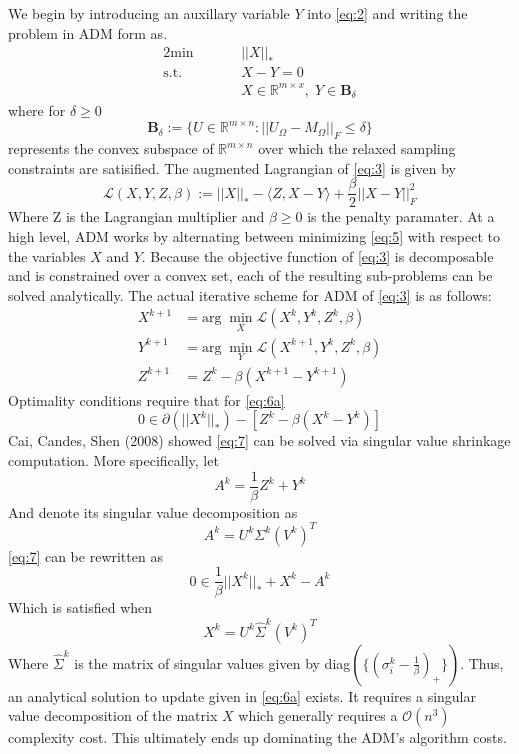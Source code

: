 \documentclass{article}
\begin{document}
We begin by introducing an auxillary variable $Y$ into \ref{eq:2} and writing the problem in ADM form as.  
\begin{alignat}{2} \label{eq:3}
\textrm{min}& \quad &&||X||_* \\
\textrm{s.t.}& &&X -Y = 0 \nonumber\\
& &&X \in \mathbb{R}^{m \times x}, \; Y \in \textbf{B}_\delta \nonumber
\end{alignat}
where for $\delta \ge 0$
\begin{equation}
\textbf{B}_\delta := \{ U \in \mathbb{R}^{m \times n}: ||U_\Omega - M_\Omega||_F \le \delta\}
\end{equation} 
represents the convex subspace of $\mathbb{R}^{m \times n}$ over which the relaxed sampling constraints are satisified. 
The augmented Lagrangian of \ref{eq:3} is given by
\begin{equation} \label{eq:5}
\mathcal{L}(X,Y,Z,\beta) := ||X||_* - \langle Z, X - Y \rangle + \frac \beta 2 ||X-Y||^2_F
\end{equation} 
Where Z is the Lagrangian multiplier and $\beta \ge 0$ is the penalty paramater.  At a high level, ADM works by alternating between minimizing \ref{eq:5} with respect to the variables $X$ and $Y$.  Because the objective function of \ref{eq:3} is decomposable and is constrained over a convex set, each of the resulting sub-problems can be solved analytically.  The actual iterative scheme for ADM of \ref{eq:3} is as follows:
\begin{subequations}
\begin{align}
X^{k+1} &= \textrm{arg} \; \min_X \mathcal{L}(X^k,Y^k,Z^k,\beta) \label{eq:6a}\\
Y^{k+1} &= \textrm{arg} \; \min_Y \mathcal{L}(X^{k+1},Y^k,Z^k,\beta) \label{eq:6b}\\
Z^{k+1} &= Z^k - \beta \left( X^{k+1} - Y^{k+1} \right) \label{eq:6c}
\end{align} 
\end{subequations}
Optimality conditions require that for \ref{eq:6a} 
\begin{equation} \label{eq:7}
0 \in \partial (||X^k||_*) - \left[ Z^k - \beta (X^k - Y^k) \right]
\end{equation} 
Cai, Candes, Shen (2008) showed \ref{eq:7} can be solved via singular value shrinkage computation.  More specifically, let
$$
A^k = \frac 1 \beta Z^k + Y^k
$$
And denote its singular value decomposition as 
$$
A^k = U^k \Sigma^k (V^k)^T
$$
\ref{eq:7} can be rewritten as 
\begin{equation} \label{eq:8}
0 \in \frac 1 \beta ||X^k||_* + X^k - A^k
\end{equation}
Which is satisfied when
\begin{equation} \label{eq:8}
X^k = U^k \hat{\Sigma}^k (V^k)^T
\end{equation}
Where $\hat{\Sigma}^k$ is the matrix of singular values given by diag$( \{ ( \sigma_i^k - \frac 1 \beta)_+ \} )$.  Thus, an analytical solution to update given in \ref{eq:6a} exists.  It requires a singular value decomposition of the matrix $X$ which generally requires a $\mathcal{O}(n^3)$ complexity cost.  This ultimately ends up dominating the ADM's algorithm costs.  
\end{document}
